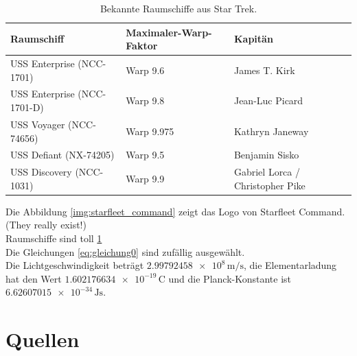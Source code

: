 \documentclass{scrartcl}
\begin{document}
\begin{table}[!ht]
    \caption{Bekannte Raumschiffe aus Star Trek.}
    \centering
    \begin{tabular}{|l||l|l|}
        \hline
        \textbf{Raumschiff}         & \textbf{Maximaler-Warp-Faktor} & \textbf{Kapitän}                 \\
        \hline
        USS Enterprise (NCC-1701)   & Warp 9.6                       & James T. Kirk                    \\
        \hline
        USS Enterprise (NCC-1701-D) & Warp 9.8                       & Jean-Luc Picard                  \\
        \hline
        USS Voyager (NCC-74656)     & Warp 9.975                     & Kathryn Janeway                  \\
        \hline
        USS Defiant (NX-74205)      & Warp 9.5                       & Benjamin Sisko                   \\
        \hline
        USS Discovery (NCC-1031)    & Warp 9.9                       & Gabriel Lorca / Christopher Pike \\
        \hline
    \end{tabular}
    \label{tab:starships}
\end{table}
Die Abbildung \ref{img:starfleet_command} zeigt das Logo von Starfleet Command. (They really exist!)\\
Raumschiffe sind toll \ref{tab:starships}\\
Die Gleichungen \eqref{eq:gleichung0} sind zufällig ausgewählt.\\

Die Lichtgeschwindigkeit \cite{einstein1966einstein} beträgt \(\num{2.99792458e8}\,\si{\meter\per\second}\),
die Elementarladung \cite{schopper1935neubestimmung} hat den Wert \(\num{1.602176634e-19}\,\si{\coulomb}\)
und die Planck-Konstante \cite{steiner2012history} ist \(\num{6.62607015e-34}\,\si{\joule\second}\).

\section*{Quellen}



\listoffigures
\listoftables
\end{document}
